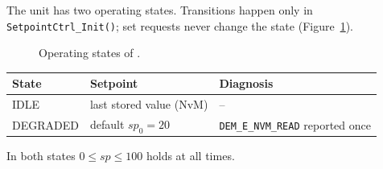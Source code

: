 %

\begin{IntendedBehavior}
The unit has two operating states. Transitions happen only in
\texttt{SetpointCtrl\_Init()}; set requests never change the state (Figure~\ref{fig:states}).

\begin{figure}[htbp]
  \centering
  \caption{Operating states of \TheUnit.}
  \label{fig:states}
\end{figure}

\begin{center}
\begin{tabular}{lll}
  \toprule
  \textbf{State} & \textbf{Setpoint} & \textbf{Diagnosis} \\ \midrule
  IDLE     & last stored value (NvM)  & -- \\
  DEGRADED & default $sp_0 = 20$      & \texttt{DEM\_E\_NVM\_READ} reported once \\
  \bottomrule
\end{tabular}
\end{center}
In both states $0 \le sp \le 100$ holds at all times.
\end{IntendedBehavior}

